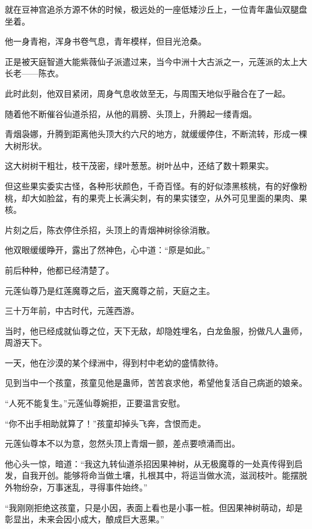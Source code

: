
\begin{this_body}



就在豆神宫追杀方源不休的时候，极远处的一座低矮沙丘上，一位青年蛊仙双腿盘坐着。

他一身青袍，浑身书卷气息，青年模样，但目光沧桑。

正是被天庭智道大能紫薇仙子派遣过来，当今中洲十大古派之一，元莲派的太上大长老——陈衣。

此时此刻，他双目紧闭，周身气息收敛至无，与周围天地似乎融合在了一起。

随着他不断催谷仙道杀招，从他的肩膀、头顶上，升腾起一缕青烟。

青烟袅娜，升腾到距离他头顶大约六尺的地方，就缓缓停住，不断流转，形成一棵大树形状。

这大树树干粗壮，枝干茂密，绿叶葱葱。树叶丛中，还结了数十颗果实。

但这些果实委实古怪，各种形状颜色，千奇百怪。有的好似漆黑核桃，有的好像粉桃，却大如脸盆，有的果壳上长满尖刺，有的果实镂空，从外可见里面的果肉、果核。

片刻之后，陈衣停住杀招，头顶上的青烟神树徐徐消散。

他双眼缓缓睁开，露出了然神色，心中道：“原是如此。”

前后种种，他都已经清楚了。

元莲仙尊乃是红莲魔尊之后，盗天魔尊之前，天庭之主。

三十万年前，中古时代，元莲西游。

当时，他已经成就仙尊之位，天下无敌，却隐姓埋名，白龙鱼服，扮做凡人蛊师，周游天下。

一天，他在沙漠的某个绿洲中，得到村中老幼的盛情款待。

见到当中一个孩童，孩童见他是蛊师，苦苦哀求他，希望他复活自己病逝的娘亲。

“人死不能复生。”元莲仙尊婉拒，正要温言安慰。

“你不出手相助就算了！”孩童却掉头飞奔，含恨而走。

元莲仙尊本不以为意，忽然头顶上青烟一颤，差点要喷涌而出。

他心头一惊，暗道：“我这九转仙道杀招因果神树，从无极魔尊的一处真传得到启发，自我开创。能够将命当做土壤，扎根其中，将运当做水流，滋润枝叶。能摆脱外物纷杂，万事迷乱，寻得事件始终。”

“我刚刚拒绝这孩童，只是小因，表面上看也是小事一桩。但因果神树萌动，却是彰显出，未来会因小成大，酿成巨大恶果。”


\end{this_body}

